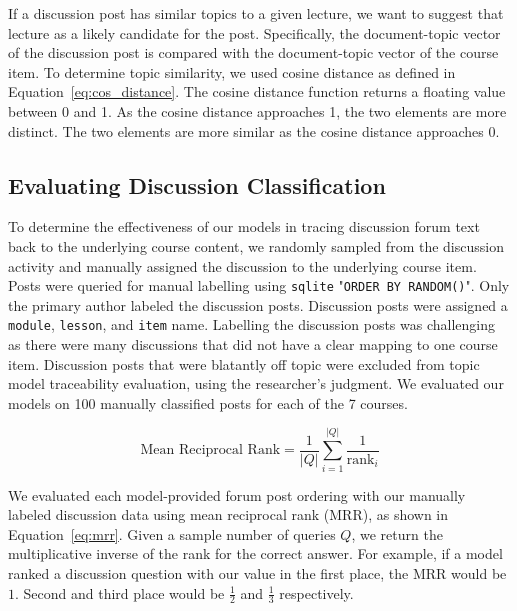 \documentclass[sigconf, anonymous]{acmart}
\begin{document}
If a discussion post has similar topics to a given lecture, we want to suggest that lecture as a likely candidate for the post.
Specifically, the document-topic vector of the discussion post is compared with the document-topic vector of the course item.
To determine topic similarity, we used cosine distance as defined in Equation~\ref{eq:cos_distance}.
The cosine distance function returns a floating value between 0 and 1. As the cosine distance approaches 1, the two elements are more distinct. The two elements are more similar as the cosine distance approaches 0.


\subsection{Evaluating Discussion Classification}


To determine the effectiveness of our models in tracing discussion forum text back to the underlying course content, we randomly sampled from the discussion activity and manually assigned the discussion to the underlying course item.
Posts were queried for manual labelling using \texttt{sqlite} "\texttt{ORDER BY RANDOM()}".
Only the primary author labeled the discussion posts.
Discussion posts were assigned a \texttt{module}, \texttt{lesson}, and \texttt{item} name.
Labelling the discussion posts was challenging as there were many discussions that did not have a clear mapping to one course item.
Discussion posts that were blatantly off topic were excluded from topic model traceability evaluation, using the researcher's judgment.
We evaluated our models on 100 manually classified posts for each of the 7 courses.

\begin{equation}
    \text{Mean Reciprocal Rank} = \frac{1}{|Q|} \sum^{|Q|}_{i=1}\frac{1}{\text{rank}_i}
    \label{eq:mrr}
\end{equation}

We evaluated each model-provided forum post ordering with our manually labeled discussion data using mean reciprocal rank (MRR), as shown in Equation~\ref{eq:mrr}.
Given a sample number of queries $Q$, we return the multiplicative inverse of the rank for the correct answer.
For example, if a model ranked a discussion question with our value in the first place, the MRR would be $1$.
Second and third place would be $\frac{1}{2}$ and $\frac{1}{3}$ respectively.
\end{document}
